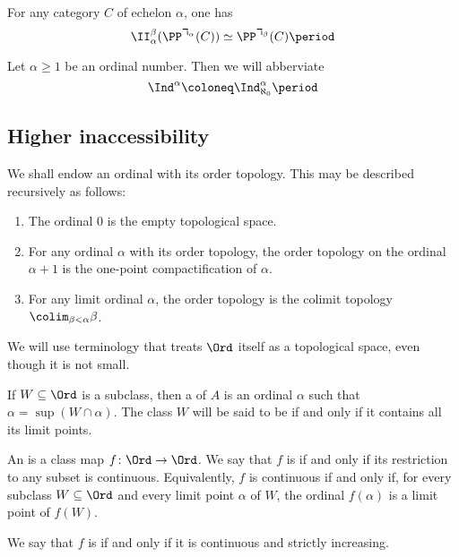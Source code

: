 \begin{eg}
	For any category $ C $ of echelon $ \alpha $,
	one has
	\[
		\II_{\alpha}^{\beta}(\PP^{\daleth_{\alpha}}(C))
		\simeq \PP^{\daleth_{\beta}}(C) \period
	\]
\end{eg}

\begin{notation}
	Let $ \alpha \geq 1 $ be an ordinal number.
	Then we will abberviate
	\[
		\Ind^{\alpha} \coloneq \Ind_{\aleph_0}^{\alpha} \period
	\]
\end{notation}

\subsection{Higher inaccessibility}%
\label{sub:higher_inaccessibility}

\begin{nul}
	We shall endow an ordinal with its order topology.
	This may be described recursively as follows:
	\begin{enumerate}
		\item The ordinal $ 0 $ is the empty topological space.
		\item For any ordinal $ \alpha $ with its order topology,
			the order topology on the ordinal $ \alpha + 1 $
			is the one-point compactification of $ \alpha $.
		\item For any limit ordinal $ \alpha $,
			the order topology is the colimit topology
			$ \colim_{\beta < \alpha} \beta $.
	\end{enumerate}
\end{nul}

We will use terminology 
that treats $ \Ord $ itself as a topological space,
even though it is not small.

\begin{definition}
	If $ W \subseteq \Ord $ is a subclass,
	then a  of $ A $ is
	an ordinal $ \alpha $ such that $ \alpha = \sup (W \cap \alpha) $.
	The class $ W $ will be said to be  if and only if
	it contains all its limit points.

	An  is a class map $ f \colon \Ord \to \Ord $.
	We say that $ f $ is  if and only if
	its restriction to any subset is continuous.
	Equivalently, $ f $ is continuous if and only if,
	for every subclass $ W \subseteq \Ord $
	and every limit point $ \alpha $ of $ W $,
	the ordinal $ f(\alpha) $ is a limit point of $ f(W) $.

	We say that $ f $ is  if and only if
	it is continuous and strictly increasing.
\end{definition}

